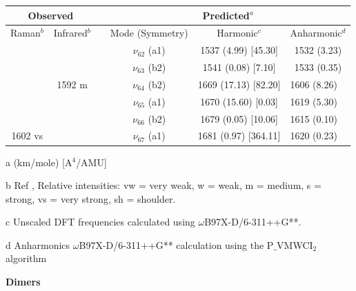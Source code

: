   
 
  \begin{table}[H]
   	\begin{center}
  		\begin{threeparttable}
  			\begin{tabular}{c c c c c c}
  				\hline
  				\multicolumn{ 2}{c}{Observed} & \multicolumn{1}{c}{} & \multicolumn{ 3}{c}{Predicted$^{a}$} \\ \hline
  				Raman$^{b}$ & \multicolumn{1}{c}{Infrared$^{b}$} &  & \multicolumn{1}{c}{Mode (Symmetry)} & \multicolumn{1}{c}{Harmonic$^{c}$} & Anharmonic$^{d}$ \\ \hline 
 &  & \multicolumn{1}{l}{} & $\nu_{62}$ (a1) & 1537 (4.99) [45.30] & 1532 (3.23) \\ 
 &  & \multicolumn{1}{l}{} &  $\nu_{63}$ (b2) & 1541 (0.08) [7.10] & 1533 (0.35) \\ 
 &  1592 m & \multicolumn{1}{l}{} &  $\nu_{64}$ (b2) & 1669 (17.13) [82.20] & \multicolumn{1}{l}{1606 (8.26)} \\ 
 &  & \multicolumn{1}{l}{} &    $\nu_{65}$ (a1) & 1670 (15.60) [0.03] & \multicolumn{1}{l}{1619 (5.30)} \\ 
 &  & \multicolumn{1}{l}{} &$\nu_{66}$ (b2) & 1679 (0.05) [10.06] & \multicolumn{1}{l}{1615 (0.10)} \\ 
 1602 vs &  & \multicolumn{1}{l}{} & $\nu_{67}$ (a1) & 1681 (0.97) [364.11] & \multicolumn{1}{l}{1620 (0.23)} \\ 
\bottomrule
\end{tabular}

\begin{tablenotes}
	\item[a] (km/mole) [A$^{4}$/AMU]
	\item[b] Ref \cite{michaelian2014raman}, Relative intensities: vw = very weak, w = weak, m = medium, s = strong, vs = very strong, sh = shoulder.
	\item[c] Unscaled DFT frequencies calculated using $\omega$B97X-D/6-311++G**.
	\item[d] Anharmonics $\omega$B97X-D/6-311++G** calculation using the P$\_$VMWCI$_{2}$ algorithm
\end{tablenotes}
\end{threeparttable}
\end{center}
\label{freq-18-dimethylfluorene}
\end{table}


 \textbf{Dimers}


